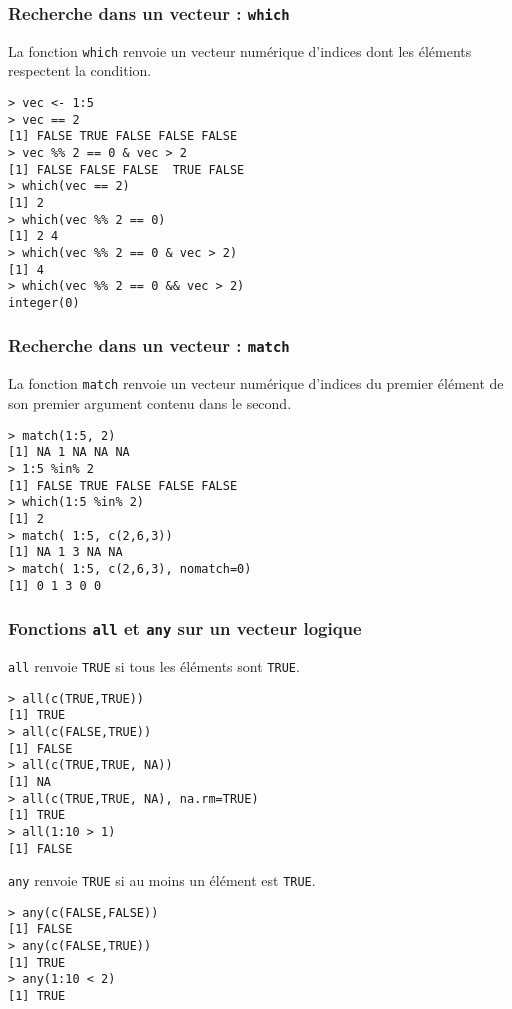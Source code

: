 \documentclass[10pt]{beamer}
\begin{document}
\begin{frame}[fragile]
  \frametitle{Recherche dans un vecteur : \texttt{which}}
  La fonction \texttt{which} renvoie un vecteur numérique d'indices dont les éléments respectent la condition.
  \begin{lstlisting}
> vec <- 1:5
> vec == 2
[1] FALSE TRUE FALSE FALSE FALSE
> vec %% 2 == 0 & vec > 2
[1] FALSE FALSE FALSE  TRUE FALSE
> which(vec == 2)
[1] 2
> which(vec %% 2 == 0)
[1] 2 4
> which(vec %% 2 == 0 & vec > 2)
[1] 4
> which(vec %% 2 == 0 && vec > 2)
integer(0)
\end{lstlisting}
\end{frame}





\begin{frame}[fragile]
  \frametitle{Recherche dans un vecteur : \texttt{match}}
  La fonction \texttt{match} renvoie un vecteur numérique d'indices du premier élément de son premier argument contenu dans le second.
  \begin{lstlisting}
> match(1:5, 2)
[1] NA 1 NA NA NA
> 1:5 %in% 2
[1] FALSE TRUE FALSE FALSE FALSE
> which(1:5 %in% 2)
[1] 2
> match( 1:5, c(2,6,3))
[1] NA 1 3 NA NA
> match( 1:5, c(2,6,3), nomatch=0)
[1] 0 1 3 0 0
  \end{lstlisting}
\end{frame}


\begin{frame}[fragile]
  \frametitle{Fonctions \texttt{all} et \texttt{any} sur un vecteur logique}

  \begin{block}{\texttt{all} renvoie \texttt{TRUE} si tous les éléments sont \texttt{TRUE}.}
  \begin{lstlisting}[style=block]
> all(c(TRUE,TRUE))
[1] TRUE
> all(c(FALSE,TRUE))
[1] FALSE
> all(c(TRUE,TRUE, NA))
[1] NA
> all(c(TRUE,TRUE, NA), na.rm=TRUE)
[1] TRUE
> all(1:10 > 1)
[1] FALSE
\end{lstlisting}
  \end{block}

  \begin{block}{\texttt{any} renvoie \texttt{TRUE} si au moins un élément est \texttt{TRUE}.}
  \begin{lstlisting}[style=block]
> any(c(FALSE,FALSE))
[1] FALSE
> any(c(FALSE,TRUE))
[1] TRUE
> any(1:10 < 2)
[1] TRUE
\end{lstlisting}
  \end{block}

\end{frame}
\end{document}
